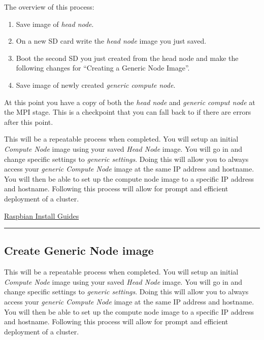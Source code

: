 \documentclass[]{article}
\providecommand{\tightlist}{%
  \setlength{\itemsep}{0pt}\setlength{\parskip}{0pt}}
\begin{document}
The overview of this process:

\begin{enumerate}
\def\labelenumi{\arabic{enumi}.}
\tightlist
\item
  Save image of \emph{head node}.
\item
  On a new SD card write the \emph{head node} image you just saved.
\item
  Boot the second SD you just created from the head node and make the
  following changes for ``Creating a Generic Node Image''.
\item
  Save image of newly created \emph{generic compute node}.
\end{enumerate}

At this point you have a copy of both the \emph{head node} and
\emph{generic comput node} at the MPI stage. This is a checkpoint that
you can fall back to if there are errors after this point.

This will be a repeatable process when completed. You will setup an
initial \emph{Compute Node} image using your saved \emph{Head Node}
image. You will go in and change specific settings to \emph{generic
settings}. Doing this will allow you to always access your \emph{generic
Compute Node} image at the same IP address and hostname. You will then
be able to set up the compute node image to a specific IP address and
hostname. Following this process will allow for prompt and efficient
deployment of a cluster.

\href{https://www.raspberrypi.org/documentation/installation/installing-images/}{Raspbian
Install Guides}

\begin{center}\rule{0.5\linewidth}{\linethickness}\end{center}

\subsection{Create Generic Node image}\label{create-generic-node-image}

This will be a repeatable process when completed. You will setup an
initial \emph{Compute Node} image using your saved \emph{Head Node}
image. You will go in and change specific settings to \emph{generic
settings}. Doing this will allow you to always access your \emph{generic
Compute Node} image at the same IP address and hostname. You will then
be able to set up the compute node image to a specific IP address and
hostname. Following this process will allow for prompt and efficient
deployment of a cluster.
\end{document}
